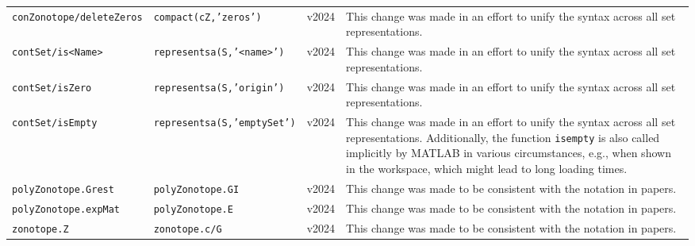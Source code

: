 \begin{table}
{\begin{tabular}{ l l l p{8cm} }
            \texttt{conZonotope/deleteZeros} & \texttt{compact(cZ,'zeros')}       & v2024          & This change was made in an effort to unify the syntax across all set representations.                                                                                                                                                                                      \\
            \texttt{contSet/is<Name>}        & \texttt{representsa(S,'<name>')}   & v2024          & This change was made in an effort to unify the syntax across all set representations.                                                                                                                                                                                      \\
            \texttt{contSet/isZero}          & \texttt{representsa(S,'origin')}   & v2024          & This change was made in an effort to unify the syntax across all set representations.                                                                                                                                                                                      \\
            \texttt{contSet/isEmpty}         & \texttt{representsa(S,'emptySet')} & v2024          & This change was made in an effort to unify the syntax across all set representations. Additionally, the function \texttt{isempty} is also called implicitly by MATLAB in various circumstances, e.g., when shown in the workspace, which might lead to long loading times. \\
            \texttt{polyZonotope.Grest}      & \texttt{polyZonotope.GI}           & v2024          & This change was made to be consistent with the notation in papers.                                                                                                                                                                                                         \\
            \texttt{polyZonotope.expMat}     & \texttt{polyZonotope.E}            & v2024          & This change was made to be consistent with the notation in papers.                                                                                                                                                                                                         \\
            \texttt{zonotope.Z}              & \texttt{zonotope.c/G}              & v2024          & This change was made to be consistent with the notation in papers.                                                                                                                                                                                                         \\

\end{tabular}}
\end{table}
